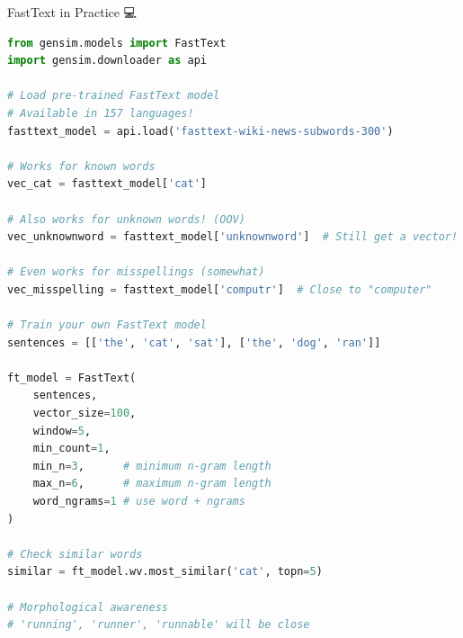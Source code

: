 \documentclass[aspectratio=169]{beamer}
\begin{document}
\begin{frame}[fragile]{FastText in Practice 💻}
\begin{lstlisting}[language=Python]
from gensim.models import FastText
import gensim.downloader as api

# Load pre-trained FastText model
# Available in 157 languages!
fasttext_model = api.load('fasttext-wiki-news-subwords-300')

# Works for known words
vec_cat = fasttext_model['cat']

# Also works for unknown words! (OOV)
vec_unknownword = fasttext_model['unknownword']  # Still get a vector!

# Even works for misspellings (somewhat)
vec_misspelling = fasttext_model['computr']  # Close to "computer"

# Train your own FastText model
sentences = [['the', 'cat', 'sat'], ['the', 'dog', 'ran']]

ft_model = FastText(
    sentences,
    vector_size=100,
    window=5,
    min_count=1,
    min_n=3,      # minimum n-gram length
    max_n=6,      # maximum n-gram length
    word_ngrams=1 # use word + ngrams
)

# Check similar words
similar = ft_model.wv.most_similar('cat', topn=5)

# Morphological awareness
# 'running', 'runner', 'runnable' will be close
\end{lstlisting}
\end{frame}
\end{document}
